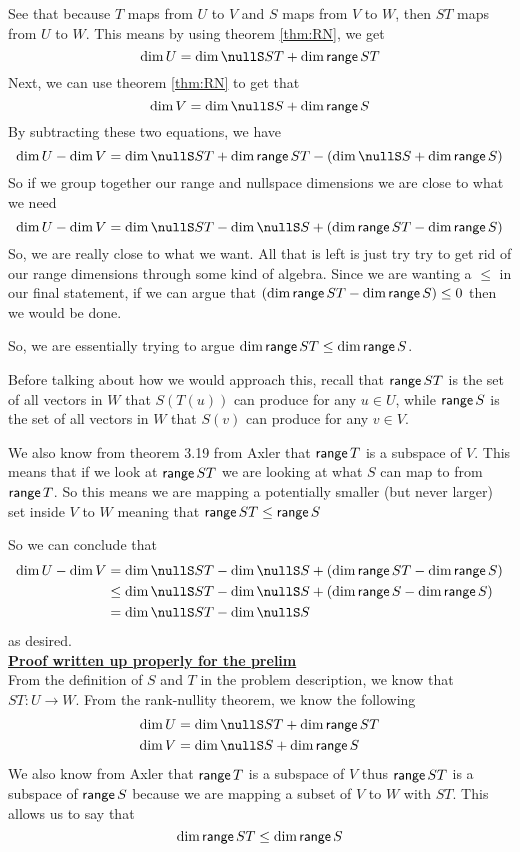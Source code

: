\documentclass[answers]{exam}
\begin{document}
\begin{questions}
\begin{solution}
        See that because $T$ maps from $U$ to $V$ and $S$ maps from $V$ to $W$, then $ST$ maps from $U$ to $W$. This means by using theorem \ref{thm:RN}, we get
        \[
            \dim U = \dim\nullS ST + \dim\range ST
        \]
        Next, we can use theorem \ref{thm:RN} to get that
        \[
            \dim V = \dim\nullS S + \dim\range S
        \]
        By subtracting these two equations, we have
        \[
            \dim U - \dim V = \dim\nullS ST + \dim\range ST - \left(\dim\nullS S + \dim\range S\right)
        \]
        So if we group together our range and nullspace dimensions we are close to what we need
        \[
            \dim U - \dim V = \dim\nullS ST - \dim\nullS S + \left(\dim\range ST - \dim\range S\right)
        \]
        So, we are really close to what we want. All that is left is just try try to get rid of our range dimensions through some kind of algebra. Since we are wanting a $\leq$ in our final statement, if  we can argue that 
        $ \left(\text{dim}\,\mathsf{range}\, ST - \text{dim}\,\mathsf{range}\, S\right) \leq 0 $ then we would be done.

        So, we are essentially trying to argue $\text{dim}\,\mathsf{range}\, ST \leq \text{dim}\,\mathsf{range}\, S$. 

        Before talking about how we would approach this, recall that $\mathsf{range}\, ST$ is the set of all
        vectors in $W$ that $S(T(u))$ can produce for any $u\in U$, while $\mathsf{range}\, S$ is the set of all
        vectors in $W$ that $S(v)$ can produce for any $v\in V$. 

        We also know from theorem 3.19 from Axler that $\mathsf{range}\, T$ is a subspace of $V$. This means that if we look 
        at $\mathsf{range}\, ST$ we are looking at what $S$ can map to from $\mathsf{range}\, T$. So this means we are mapping
        a potentially smaller (but never larger) set inside $V$ to $W$ meaning that $\mathsf{range}\, ST \leq \mathsf{range}\, S$

        So we can conclude that
        \begin{align*}
            \dim U - \dim V &= \dim\nullS ST - \dim\nullS S + \left(\dim\range ST - \dim\range S\right) \\
            &\leq \dim\nullS ST - \dim\nullS S + \left(\dim\range S - \dim\range S\right) \\
            &= \dim\nullS ST - \dim\nullS S
        \end{align*}
        as desired.
        \\\underline{\textbf{Proof written up properly for the prelim}}\\
        From the definition of $S$ and $T$ in the problem description, we know that $ST:U\rightarrow W$. From the rank-nullity theorem, we know the following
        \begin{align*}
            \dim U &= \dim\nullS ST + \dim\range ST \\
            \dim V &= \dim\nullS S + \dim\range S
        \end{align*}
        We also know from Axler that $\mathsf{range}\, T$ is a subspace of $V$ thus $\mathsf{range}\, ST$ is a subspace of $\mathsf{range}\, S$
        because we are mapping a subset of $V$ to $W$ with $ST$. This allows us to say that
        \[
            \text{dim}\,\mathsf{range}\, ST \leq \text{dim}\,\mathsf{range}\, S
        \]


\end{solution}
\end{questions}
\end{document}
